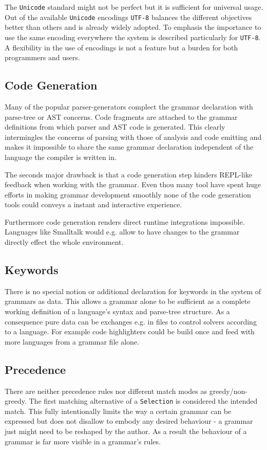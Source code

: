 \documentclass[10pt,a4paper]{article}
\begin{document}
The \texttt{Unicode} standard might not be perfect but it is sufficient for universal usage. Out of the available \texttt{Unicode} encodings \texttt{UTF-8} balances the different objectives better than others and is already widely adopted. To emphasis the importance to use the same encoding everywhere the system is described particularly for \texttt{UTF-8}. A flexibility in the use of encodings is not a feature but a burden for both programmers and users.

\subsection{Code Generation}
Many of the popular parser-generators complect the grammar declaration with parse-tree or AST concerns. Code fragments are attached to the grammar definitions from which parser and AST code is generated. This clearly intermingles the concerns of parsing with those of analysis and code emitting and makes it impossible to share the same grammar declaration independent of the language the compiler is written in. 

The seconds major drawback is that a code generation step hinders  REPL-like feedback when working with the grammar. Even thou many tool have spent huge efforts in making grammar development smoothly none of the code generation tools could conveys a instant and interactive experience. 

Furthermore code generation renders direct runtime integrations impossible. Languages like Smalltalk would e.g. allow to have changes to the grammar directly effect the whole environment.

\subsection{Keywords}
There is no special notion or additional declaration for keywords in the system of grammars as data. This allows a grammar alone to be sufficient as a complete working definition of a language's syntax and parse-tree structure. As a consequence pure data can be exchanges e.g. in files to control solvers according to a language. For example code highlighters could be build once and feed with more languages from a grammar file alone.

\subsection{Precedence}
There are neither precedence rules nor different match modes as greedy/non-greedy. The first matching alternative of a \texttt{Selection} is considered the intended match. This fully intentionally limits the way a certain grammar can be expressed but does not disallow to embody any desired behaviour - a grammar just might need to be reshaped by the author. As a result the behaviour of a grammar is far more visible in a grammar's rules.
\end{document}
